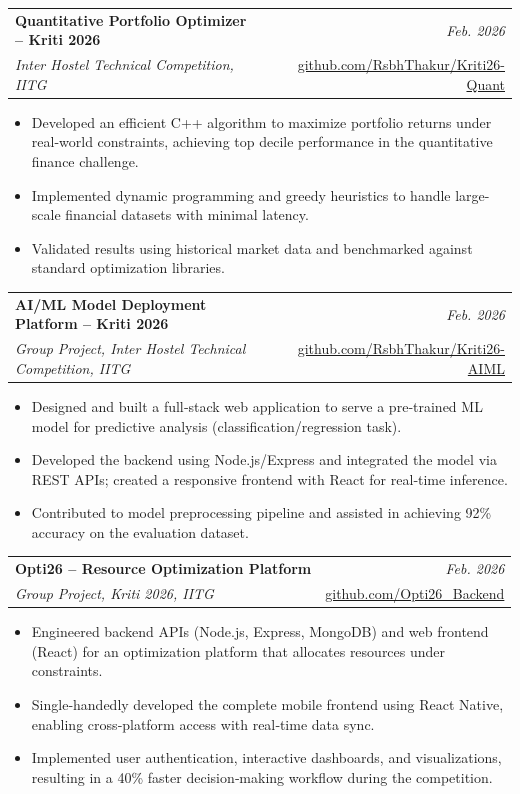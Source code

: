 \documentclass[a4paper,11pt]{article}
\makeatletter
\newcommand{\resumeProject}[4]{
\vspace{0.5mm}\item
    \begin{tabular*}{0.98\textwidth}[t]{l@{\extracolsep{\fill}}r}
        \textbf{#1} & \textit{\footnotesize{#3}} \\
        \footnotesize{\textit{#2}} & \footnotesize{#4}
    \end{tabular*}
    \vspace{-2.4mm}
}
\newcommand{\resumeItemListStart}{\begin{justify}\begin{itemize}[leftmargin=3ex, rightmargin=2ex, noitemsep,labelsep=1.2mm,itemsep=0mm]\small}
\newcommand{\resumeItemListEnd}{\end{itemize}\end{justify}\vspace{-2mm}}
\makeatother
\begin{document}
    \resumeProject
      {Quantitative Portfolio Optimizer – Kriti 2026} %
      {Inter Hostel Technical Competition, IITG} %
      {Feb. 2026} %
      {\faGithub \href{https://github.com/RsbhThakur/Kriti26-Quant}{ github.com/RsbhThakur/Kriti26-Quant}} %
      \vspace{1mm}
      \resumeItemListStart
        \item {Developed an efficient C++ algorithm to maximize portfolio returns under real-world constraints, achieving top decile performance in the quantitative finance challenge.}
        \item {Implemented dynamic programming and greedy heuristics to handle large-scale financial datasets with minimal latency.}
        \item {Validated results using historical market data and benchmarked against standard optimization libraries.}
      \resumeItemListEnd

    \resumeProject
      {AI/ML Model Deployment Platform – Kriti 2026} %
      {Group Project, Inter Hostel Technical Competition, IITG} %
      {Feb. 2026} %
      {\faGithub \href{https://github.com/RsbhThakur/Kriti26-AIML}{ github.com/RsbhThakur/Kriti26-AIML}} %
      \vspace{1mm}
      \resumeItemListStart
        \item {Designed and built a full‑stack web application to serve a pre‑trained ML model for predictive analysis (classification/regression task).}
        \item {Developed the backend using Node.js/Express and integrated the model via REST APIs; created a responsive frontend with React for real‑time inference.}
        \item {Contributed to model preprocessing pipeline and assisted in achieving 92\% accuracy on the evaluation dataset.}
      \resumeItemListEnd

    \resumeProject
      {Opti26 – Resource Optimization Platform} %
      {Group Project, Kriti 2026, IITG} %
      {Feb. 2026} %
      {\faGithub \href{https://github.com/aditya-prabhakar-13/Opti26_Backend}{ github.com/Opti26\_Backend}} %
      \vspace{1mm}
      \resumeItemListStart
        \item {Engineered backend APIs (Node.js, Express, MongoDB) and web frontend (React) for an optimization platform that allocates resources under constraints.}
        \item {Single‑handedly developed the complete mobile frontend using React Native, enabling cross‑platform access with real‑time data sync.}
        \item {Implemented user authentication, interactive dashboards, and visualizations, resulting in a 40\% faster decision‑making workflow during the competition.}
      \resumeItemListEnd
\end{document}
